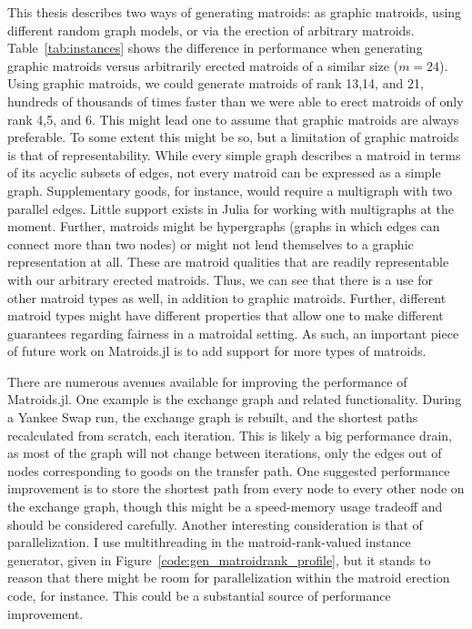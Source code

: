 This thesis describes two ways of generating matroids: as graphic matroids, using different random graph models, or via the erection of arbitrary matroids. Table~\ref{tab:instances} shows the difference in performance when generating graphic matroids versus arbitrarily erected matroids of a similar size ($m=24$). Using graphic matroids, we could generate matroids of rank 13,14, and 21, hundreds of thousands of times faster than we were able to erect matroids of only rank 4,5, and 6. This might lead one to assume that graphic matroids are always preferable. To some extent this might be so, but a limitation of graphic matroids is that of representability. While every simple graph describes a matroid in terms of its acyclic subsets of edges, not every matroid can be expressed as a simple graph. Supplementary goods, for instance, would require a multigraph with two parallel edges. Little support exists in Julia for working with multigraphs at the moment. Further, matroids might be hypergraphs (graphs in which edges can connect more than two nodes) or might not lend themselves to a graphic representation at all. These are matroid qualities that are readily representable with our arbitrary erected matroids. Thus, we can see that there is a use for other matroid types as well, in addition to graphic matroids. Further, different matroid types might have different properties that allow one to make different guarantees regarding fairness in a matroidal setting. As such, an important piece of future work on Matroids.jl is to add support for more types of matroids.

There are numerous avenues available for improving the performance of Matroids.jl. One example is the exchange graph and related functionality. During a Yankee Swap run, the exchange graph is rebuilt, and the shortest paths recalculated from scratch, each iteration. This is likely a big performance drain, as most of the graph will not change between iterations, only the edges out of nodes corresponding to goods on the transfer path. One suggested performance improvement is to store the shortest path from every node to every other node on the exchange graph, though this might be a speed-memory usage tradeoff and should be considered carefully. Another interesting consideration is that of parallelization. I use multithreading in the matroid-rank-valued instance generator, given in Figure~\ref{code:gen_matroidrank_profile}, but it stands to reason that there might be room for parallelization within the matroid erection code, for instance. This could be a substantial source of performance improvement.

